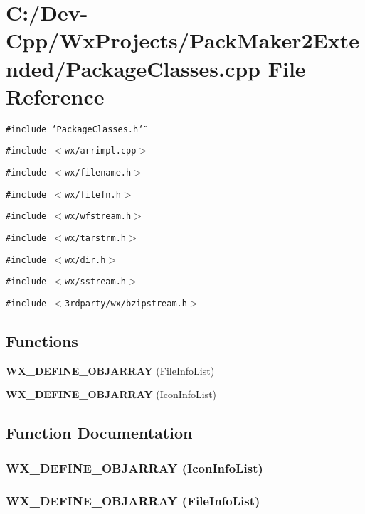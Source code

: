 \section{C:/Dev-Cpp/Wx\-Projects/Pack\-Maker2Extended/Package\-Classes.cpp File Reference}
\label{_package_classes_8cpp}
{\tt \#include \char`\"{}Package\-Classes.h\char`\"{}}\par
{\tt \#include $<$wx/arrimpl.cpp$>$}\par
{\tt \#include $<$wx/filename.h$>$}\par
{\tt \#include $<$wx/filefn.h$>$}\par
{\tt \#include $<$wx/wfstream.h$>$}\par
{\tt \#include $<$wx/tarstrm.h$>$}\par
{\tt \#include $<$wx/dir.h$>$}\par
{\tt \#include $<$wx/sstream.h$>$}\par
{\tt \#include $<$3rdparty/wx/bzipstream.h$>$}\par
\subsection*{Functions}
\begin{CompactItemize}
\item 
{\bf WX\_\-DEFINE\_\-OBJARRAY} (File\-Info\-List)
\item 
{\bf WX\_\-DEFINE\_\-OBJARRAY} (Icon\-Info\-List)
\end{CompactItemize}


\subsection{Function Documentation}
\subsubsection{\setlength{\rightskip}{0pt plus 5cm}WX\_\-DEFINE\_\-OBJARRAY (Icon\-Info\-List)}\label{_package_classes_8cpp_eb5f95f4224858dc9ca50c2c7a0e73d5}


\subsubsection{\setlength{\rightskip}{0pt plus 5cm}WX\_\-DEFINE\_\-OBJARRAY (File\-Info\-List)}\label{_package_classes_8cpp_449841907ac2d32a1760e24c9dc31b31}



